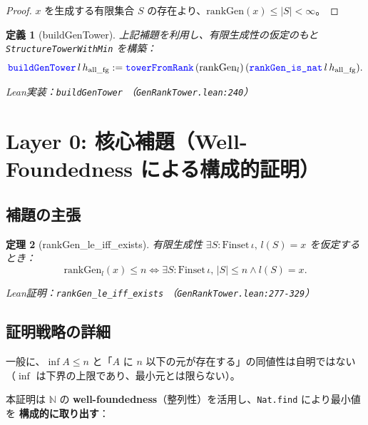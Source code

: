 \documentclass[a4paper,12pt]{ltjsarticle}
\newtheorem{definition}{定義}[section]
\newtheorem{theorem}[definition]{定理}
\newcommand{\N}{\mathbb{N}}
\newcommand{\Lean}[1]{\texttt{\color{blue}#1}}
\begin{document}
\begin{proof}
$x$ を生成する有限集合 $S$ の存在より、$\mathrm{rankGen}(x) \le |S| < \infty$。
\end{proof}

\begin{definition}[buildGenTower]
上記補題を利用し、有限生成性の仮定のもと \texttt{StructureTowerWithMin} を構築：
\[
  \Lean{buildGenTower}\, l\, h_{\text{all\_fg}} := \Lean{towerFromRank}\, (\mathrm{rankGen}_l)\, (\Lean{rankGen\_is\_nat}\, l\, h_{\text{all\_fg}}).
\]

Lean実装：\Lean{buildGenTower} （\texttt{GenRankTower.lean:240}）
\end{definition}

\section{Layer 0: 核心補題（Well-Foundedness による構成的証明）}

\subsection{補題の主張}

\begin{theorem}[rankGen\_le\_iff\_exists]
有限生成性 $\exists S : \mathrm{Finset}\, \iota,\, l(S) = x$ を仮定するとき：
\[
  \mathrm{rankGen}_l(x) \le n \iff \exists S : \mathrm{Finset}\, \iota,\, |S| \le n \land l(S) = x.
\]

Lean証明：\Lean{rankGen\_le\_iff\_exists} （\texttt{GenRankTower.lean:277-329}）
\end{theorem}

\subsection{証明戦略の詳細}

一般に、$\inf A \le n$ と「$A$ に $n$ 以下の元が存在する」の同値性は自明ではない（$\inf$ は下界の上限であり、最小元とは限らない）。

本証明は $\N$ の \textbf{well-foundedness}（整列性）を活用し、\texttt{Nat.find} により最小値を \textbf{構成的に取り出す}：
\end{document}
